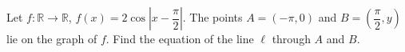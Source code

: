 Let $f:\mathbb R\to\mathbb R$, $f(x)=2\cos\left|x-\dfrac{\pi}{2}\right|$. The points $A=(-\pi,0)$ and $B=\left(\dfrac{\pi}{2},y\right)$ lie on the graph of $f$. Find the equation of the line $\ell$ through $A$ and $B$.
